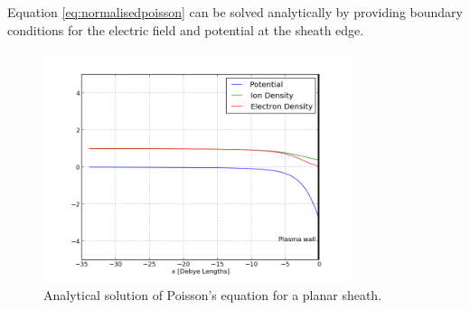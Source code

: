 \documentclass[12pt]{article}
\def\be{\begin{equation}}
\def\ee{\end{equation}}
\begin{document}
%
%
%
%
%
Equation \eqref{eq:normalisedpoisson} can be solved analytically by providing boundary conditions for the electric field and potential at the sheath edge. 
\begin{figure}[H]
\centering
\includegraphics[width=0.8\textwidth]{graphofpotentialanddensity}
\caption{Analytical solution of Poisson's equation for a planar sheath.}
\label{fig:numericalsolution}
\end{figure}
\end{document}
